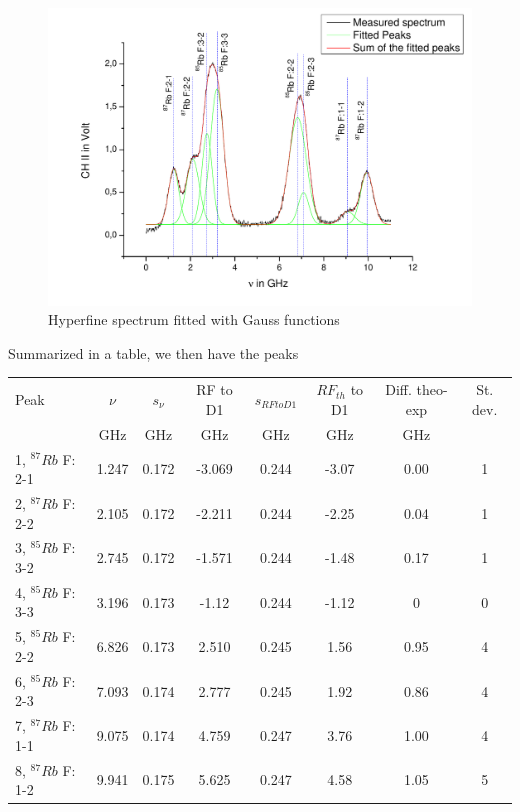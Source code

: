 \begin{figure}[H]
\centering \includegraphics[width=1.1\textwidth]{BilderAusw/HFSAusw.pdf}
\caption{Hyperfine spectrum fitted with Gauss functions}
\end{figure}

Summarized in a table, we then have the peaks

\begin{center}
\begin{tabular}[H]{| l | c c | c c c c c |} \hline
Peak & $\nu$ & $s_{\nu}$ & RF to D1 & $s_{RF to D1}$ & $RF_{th}$ to D1 & Diff. theo-exp & St. dev. \\ \cline{2-8}
 & GHz & GHz & GHz & GHz & GHz & GHz & \\ \hline \hline
1, $^{87}Rb$ F: 2-1 & 1.247 & 0.172	 & -3.069	& 0.244	& -3.07	& 0.00 & 1		\\
2, $^{87}Rb$ F: 2-2 & 2.105 & 0.172 & -2.211	& 0.244	& -2.25	& 0.04 & 1		\\
3, $^{85}Rb$ F: 3-2 & 2.745 & 0.172	 & -1.571	& 0.244	& -1.48	& 0.17 & 1		\\
4, $^{85}Rb$ F: 3-3 & 3.196 & 0.173	 & -1.12  	& 0.244	& -1.12	& 0	   & 0		\\
5, $^{85}Rb$ F: 2-2 & 6.826 & 0.173	 & 2.510 	& 0.245	& 1.56	& 0.95 & 4		\\
6, $^{85}Rb$ F: 2-3 & 7.093 & 0.174	 & 2.777 	& 0.245	& 1.92	& 0.86 & 4		\\
7, $^{87}Rb$ F: 1-1 & 9.075 & 0.174	 & 4.759 	& 0.247	& 3.76	& 1.00 & 4		\\
8, $^{87}Rb$ F: 1-2 & 9.941 & 0.175 & 5.625 	& 0.247	& 4.58	& 1.05 & 5		\\ \hline
\end{tabular}\\ 
\end{center}

